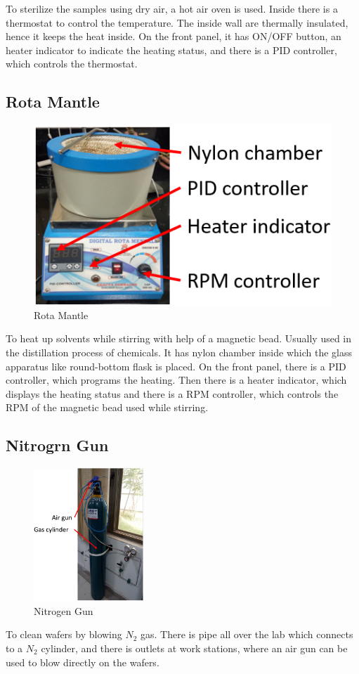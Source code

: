 \documentclass[12pt,a4paper,bold]{thesis}
\theoremstyle{thm}
\theoremstyle{definition}
\begin{document}
To sterilize the samples using dry air, a hot air oven is used. Inside there is a thermostat to control the temperature. The inside wall are thermally insulated, hence it keeps the heat inside. On the front panel, it has ON/OFF button, an heater indicator to indicate the heating status, and there is a PID controller, which controls the thermostat.  

\subsection{Rota Mantle}

\begin{figure}[H]
	\centering
   \includegraphics[scale=0.56]{Images/9.png} 
   \caption{Rota Mantle}
\end{figure}
To heat up solvents while stirring with help of a magnetic bead. Usually used in the distillation process of chemicals. It has nylon chamber inside which the glass apparatus like round-bottom flask is placed. On the front panel, there is a PID controller, which programs the heating. Then there is a heater indicator, which displays the heating status and there is a RPM controller, which controls the RPM of the magnetic bead used while stirring. 

\subsection{Nitrogrn Gun}
\begin{figure}[H]
	\centering
   \includegraphics[height=5cm]{Images/10.png} 
   \caption{Nitrogen Gun}
\end{figure}
To clean wafers by blowing $N_2$ gas. There is pipe all over the lab which connects to a $N_2$ cylinder, and there is outlets at work stations, where an air gun can be used to blow directly on the wafers.
\end{document}

